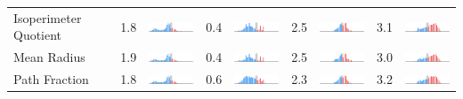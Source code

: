 \begin{table}
\begin{tabular}{lcccccccc}
Isoperimeter Quotient  &     1.8 &       \includegraphics[width=7em]{comp_hist/il_polsby} &     0.4 &       \includegraphics[width=7em]{comp_hist/md_polsby} &     2.5 &       \includegraphics[width=7em]{comp_hist/nc_polsby} &     3.1 &       \includegraphics[width=7em]{comp_hist/tx_polsby} \\
Mean Radius            &     1.9 &  \includegraphics[width=7em]{comp_hist/il_mean_radius} &     0.4 &  \includegraphics[width=7em]{comp_hist/md_mean_radius} &     2.5 &  \includegraphics[width=7em]{comp_hist/nc_mean_radius} &     3.0 &  \includegraphics[width=7em]{comp_hist/tx_mean_radius} \\
Path Fraction          &     1.8 &    \includegraphics[width=7em]{comp_hist/il_path_frac} &     0.6 &    \includegraphics[width=7em]{comp_hist/md_path_frac} &     2.3 &    \includegraphics[width=7em]{comp_hist/nc_path_frac} &     3.2 &    \includegraphics[width=7em]{comp_hist/tx_path_frac} \\

\end{tabular}
\end{table}
